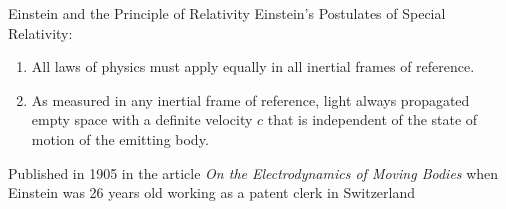 \documentclass[12pt,aspectratio=169]{beamer}
\begin{document}
\begin{frame}{Einstein and the Principle of Relativity}
  Einstein's Postulates of Special Relativity:
  \begin{enumerate}
  \item All laws of physics must apply equally in all inertial frames of
    reference.
  \item As measured in any inertial frame of reference, light always propagated
    empty space with a definite velocity $c$ that is independent of the state
    of motion of the emitting body.
  \end{enumerate}
  Published in 1905 in the article
  \emph{On the Electrodynamics of Moving Bodies} when Einstein was 26 years old
  working as a patent clerk in Switzerland
\end{frame}
\end{document}
